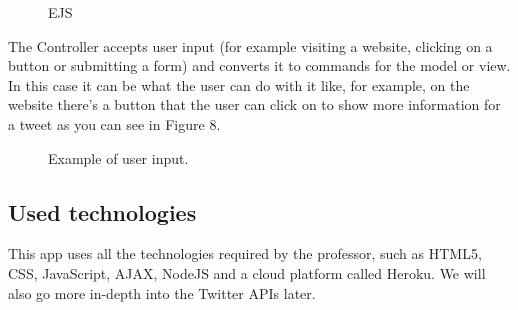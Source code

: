 \documentclass[12pt]{article} %
\begin{document}
\begin{figure}[H] %
\caption{EJS}
\label{EJS}
\end{figure}

\noindent The Controller accepts user input (for example visiting a website, clicking on a button or submitting a form) and converts it to commands for the model or view. In this case it can be what the user can do with it like, for example, on the website there's a button that the user can click on to show more information for a tweet as you can see in Figure 8.

\begin{figure}[H] %
\caption{Example of user input.}
\label{hashtagButton}
\end{figure}

\subsection{Used technologies}
\noindent This app uses all the technologies required by the professor, such as HTML5, CSS, JavaScript, AJAX, NodeJS and a cloud platform called Heroku. We will also go more in-depth into the Twitter APIs later.
\end{document}
